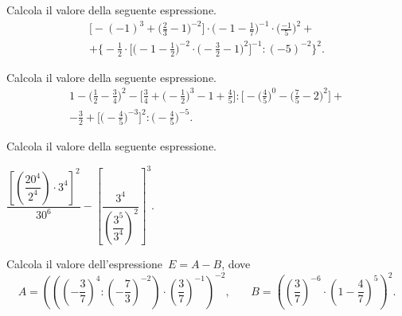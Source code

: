 \begin{esercizio}[\Ast]%
 Calcola il valore della seguente espressione.
\begin{multline*}
\bigg[-(-1)^{3}+\bigg(\frac{2}{3}-1\bigg)^{-2}\bigg]\cdot\bigg(-1-\frac{1}{7}\bigg)^{-1}\cdot%
\bigg(\frac{-1}{5}\bigg)^{2}+\\%
+\bigg\{-{\frac{1}{2}}\cdot\bigg[\bigg(-1-\frac{1}{2}\bigg)^{-2}\cdot%
\bigg(-{\frac{3}{2}}-1\bigg)^{2}\bigg]^{-1}:(-5)^{-2}\bigg\}^{2}.
\end{multline*}
\end{esercizio}

\begin{esercizio}[\Ast]%
 Calcola il valore della seguente espressione.
\begin{multline*}
1-\bigg(\frac{1}{2}-\frac{3}{4}\bigg)^{2}-\bigg[\frac{3}{4}+\bigg(-{\frac{1}{2}}\bigg)^{3}-1+\frac{4}{5}\bigg]:%
\bigg[-\bigg(\frac{4}{5}\bigg)^{0}-\bigg(\frac{7}{5}-2\bigg)^{2}\bigg]+\\%
-\frac{3}{2}+\bigg[\bigg(-{\frac{4}{5}}\bigg)^{-3}\bigg]^{2}:\bigg(-{\frac{4}{5}}\bigg)^{-5}.
\end{multline*}
\end{esercizio}

\begin{esercizio}[\Ast]%
 Calcola il valore della seguente espressione.
 
$\dfrac{\left[\left(\dfrac{20^4}{2^4}\right)\cdot 3^4\right]^2}{30^6}-\left[\dfrac{3^4}{\left(\dfrac{3^5}{3^4}\right)^2}\right]^3$.
\end{esercizio}

\begin{esercizio}%
Calcola il valore dell'espressione~$E = A- B$, dove
\[A=\left(\left(\left(-{\frac{3}{7}}\right)^{4}:\left(-{\frac{7}{3}}\right)^{-2}\right)\cdot%
\left(\frac{3}{7}\right)^{-1}\right)^{-2}\text{,}\qquad
B=\left(\left(\frac{3}{7}\right)^{-6}\cdot%
\left(1-\frac{4}{7}\right)^{5}\right)^{2}.\]
 \end{esercizio}

